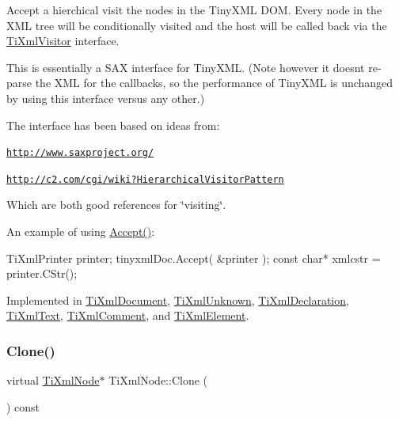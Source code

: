 Accept a hierchical visit the nodes in the Tiny\+X\+ML D\+OM. Every node in the X\+ML tree will be conditionally visited and the host will be called back via the \hyperlink{classTiXmlVisitor}{Ti\+Xml\+Visitor} interface.

This is essentially a S\+AX interface for Tiny\+X\+ML. (Note however it doesn\textquotesingle{}t re-\/parse the X\+ML for the callbacks, so the performance of Tiny\+X\+ML is unchanged by using this interface versus any other.)

The interface has been based on ideas from\+:


\begin{DoxyItemize}
\item \href{http://www.saxproject.org/}{\tt http\+://www.\+saxproject.\+org/}
\item \href{http://c2.com/cgi/wiki?HierarchicalVisitorPattern}{\tt http\+://c2.\+com/cgi/wiki?\+Hierarchical\+Visitor\+Pattern}
\end{DoxyItemize}

Which are both good references for \char`\"{}visiting\char`\"{}.

An example of using \hyperlink{classTiXmlNode_acc0f88b7462c6cb73809d410a4f5bb86}{Accept()}\+: \begin{DoxyVerb}TiXmlPrinter printer;
tinyxmlDoc.Accept( &printer );
const char* xmlcstr = printer.CStr();
\end{DoxyVerb}
 

Implemented in \hyperlink{classTiXmlDocument_a8ddd6eec722cbd25900bbac664909bac}{Ti\+Xml\+Document}, \hyperlink{classTiXmlUnknown_aafdf1b2d4f561979c7907bad91004999}{Ti\+Xml\+Unknown}, \hyperlink{classTiXmlDeclaration_aa1b6bade6c989407ce9881bdfc73c1e6}{Ti\+Xml\+Declaration}, \hyperlink{classTiXmlText_af65964326eac4640bfb97d4622fa0de2}{Ti\+Xml\+Text}, \hyperlink{classTiXmlComment_ac894241530d1d266131a5026cb251a95}{Ti\+Xml\+Comment}, and \hyperlink{classTiXmlElement_a01d33358cce9d1817b557d314dda3779}{Ti\+Xml\+Element}.

\mbox{\label{classTiXmlNode_a4508cc3a2d7a98e96a54cc09c37a78a4}} 
\subsubsection{\texorpdfstring{Clone()}{Clone()}}
{\footnotesize\ttfamily virtual \hyperlink{classTiXmlNode}{Ti\+Xml\+Node}$\ast$ Ti\+Xml\+Node\+::\+Clone (\begin{DoxyParamCaption}{ }\end{DoxyParamCaption}) const\hspace{0.3cm}{\ttfamily [pure virtual]}}

